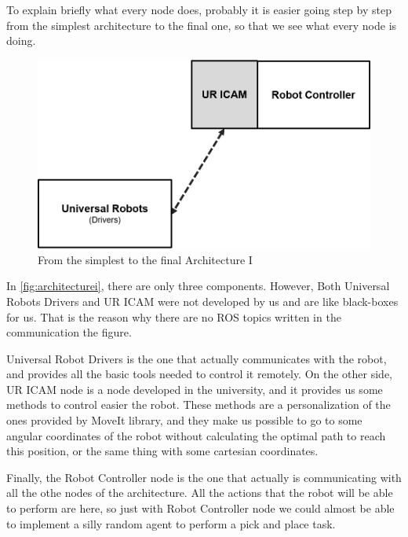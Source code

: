 		To explain briefly what every node does, probably it is easier going step by step from the simplest architecture to the final one, so that we see what every node is doing.
		
		\begin{figure}[H]
			\centering
			\includegraphics[width=0.7\linewidth]{Images/ArchitectureI}
			\caption[Architecture I]{From the simplest to the final Architecture I}
			\label{fig:architecturei}
		\end{figure}
	
		In \autoref{fig:architecturei}, there are only three components. However, Both Universal Robots Drivers and UR ICAM were not developed by us and are like black-boxes for us. That is the reason why there are no ROS topics written in the communication the figure.
		
		Universal Robot Drivers is the one that actually communicates with the robot, and provides all the basic tools needed to control it remotely. On the other side, UR ICAM node is a node developed in the university, and it provides us some methods to control easier the robot. These methods are a personalization of the ones provided by MoveIt library, and they make us possible to go to some angular coordinates of the robot without calculating the optimal path to reach this position, or the same thing with some cartesian coordinates.
		
		Finally, the Robot Controller node is the one that actually is communicating with all the othe nodes of the architecture. All the actions that the robot will be able to perform are here, so just with Robot Controller node we could almost be able to implement a silly random agent to perform a pick and place task.
	
